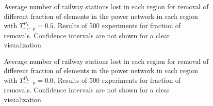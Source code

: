 \documentclass[review]{elsarticle}
\begin{document}
	\begin{figure}[h]
	\centering
	\caption{Average number of railway stations lost in each region for removal of different fraction of elements in the power network in each region with $T_{r \leftarrow p}^{P_L}=0.5$. Results of 500 experiments for fraction of removals. Confidence intervals are not shown for a clear visualization.}
	\label{regions_tp50}
\end{figure}



	\begin{figure}[h]
	\centering
	\caption{Average number of railway stations lost in each region for removal of different fraction of elements in the power network in each region with $T_{r \leftarrow p}^{P_L}=0.0$. Results of 500 experiments for fraction of removals. Confidence intervals are not shown for a clear visualization.}
	\label{regions_tp0}
\end{figure}

\appendix
\end{document}
